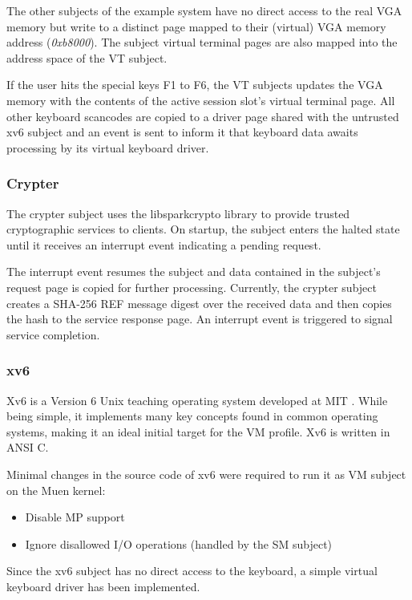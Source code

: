 The other subjects of the example system have no direct access to the real VGA
memory but write to a distinct page mapped to their (virtual) VGA memory
address (\emph{0xb8000}). The subject virtual terminal pages are also mapped
into the address space of the VT subject.

If the user hits the special keys F1 to F6, the VT subjects updates the VGA
memory with the contents of the active session slot's virtual terminal page.
All other keyboard scancodes are copied to a driver page shared with the
untrusted xv6 subject and an event is sent to inform it that keyboard data
awaits processing by its virtual keyboard driver.

\subsubsection{Crypter}
The crypter subject uses the libsparkcrypto \cite{libsparkcrypto} library to
provide trusted cryptographic services to clients. On startup, the subject
enters the halted state until it receives an interrupt event indicating a
pending request.

The interrupt event resumes the subject and data contained in the subject's
request page is copied for further processing. Currently, the crypter subject
creates a SHA-256 REF message digest over the received data and then copies the
hash to the service response page. An interrupt event is triggered to signal
service completion.

\subsubsection{xv6}\label{subsubsec:xv6}
Xv6 is a Version 6 Unix \cite{wiki:unix6} teaching operating system
developed at MIT \cite{xv6}. While being simple, it implements many key
concepts found in common operating systems, making it an ideal initial target
for the VM profile. Xv6 is written in ANSI C.

Minimal changes in the source code of xv6 were required to run it as VM subject
on the Muen kernel:
\begin{itemize}
	\item Disable MP support
	\item Ignore disallowed I/O operations (handled by the SM subject)
\end{itemize}

Since the xv6 subject has no direct access to the keyboard, a simple virtual
keyboard driver has been implemented.

